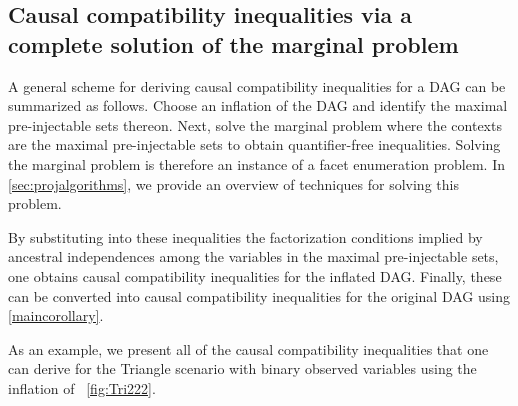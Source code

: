 \subsection{Causal compatibility inequalities via a complete solution of the marginal problem}\label{sec:CCineqs}

A general scheme for deriving causal compatibility inequalities for a DAG can be summarized as follows.  Choose an inflation of the DAG and identify the maximal pre-injectable sets thereon.  Next, solve the marginal problem where the contexts are the maximal pre-injectable sets to obtain quantifier-free inequalities. Solving the marginal problem is therefore an instance of a facet enumeration problem. In \cref{sec:projalgorithms}, we provide an overview of techniques for solving this problem. 


By substituting into these inequalities the factorization conditions implied by ancestral independences among the variables in the maximal pre-injectable sets, one obtains causal compatibility inequalities for the inflated DAG.  Finally, these can be converted into causal compatibility inequalities for the original DAG using \cref{maincorollary}.




As an example, 
we present all of the causal compatibility inequalities that one can derive for the Triangle scenario with binary observed variables using the inflation of  ~\cref{fig:Tri222}.

